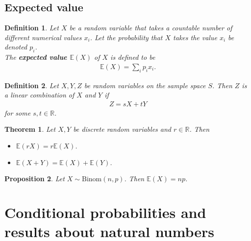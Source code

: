 \documentclass{article}
\theoremstyle{sltheorem}
\newtheorem{definition}{Definition}[section]
\newtheorem{theorem}{Theorem}[section]
\newtheorem{proposition}[theorem]{Proposition}
\newcommand{\R}{\mathbb{R}}
\newcommand{\E}{\mathbb{E}}
\newcommand*\B[1]{\textbf{#1}}
\begin{document}
\subsection{Expected value}
\begin{definition}
    Let $X$ be a random variable that takes a countable number of different
    numerical values $x_i$. Let the probability that $X$ takes the value $x_i$
    be denoted $p_i$.\\
    The \B{expected value $\E(X)$} of $X$ is defined to be
    \begin{align*}
        \E(X) = \sum_i p_i x_i.
    \end{align*}
\end{definition}
\begin{definition}
    Let $X,Y,Z$ be random variables on the sample space $S$.
    Then $Z$ is a linear combination of $X$ and $Y$ if
    \begin{align*}
        Z = sX + tY
    \end{align*}
    for some $s,t\in\R$.
\end{definition}
\begin{theorem}
    Let $X,Y$ be discrete random variables and $r\in\R$. Then
    \begin{itemize}
        \item $\E(rX)=r\E(X)$.
        \item $\E(X + Y) = \E(X) + \E(Y)$.
    \end{itemize}
\end{theorem}
\begin{proposition}
    Let $X\sim\text{Binom}(n,p)$. Then $\E(X)=np$.
\end{proposition}
\section{Conditional probabilities and results about natural numbers}
\end{document}
